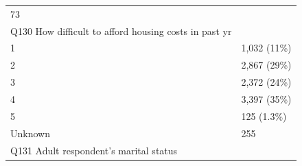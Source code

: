 \documentclass[]{article}
\begin{document}
\begin{longtable}[]{@{}ll@{}}
\begin{minipage}[t]{0.23\columnwidth}
73\strut
\end{minipage}\tabularnewline
\begin{minipage}[t]{0.71\columnwidth}\raggedright
Q130 How difficult to afford housing costs in past yr\strut
\end{minipage} & \begin{minipage}[t]{0.23\columnwidth}\raggedright
\strut
\end{minipage}\tabularnewline
\begin{minipage}[t]{0.71\columnwidth}\raggedright
1\strut
\end{minipage} & \begin{minipage}[t]{0.23\columnwidth}\raggedright
1,032 (11\%)\strut
\end{minipage}\tabularnewline
\begin{minipage}[t]{0.71\columnwidth}\raggedright
2\strut
\end{minipage} & \begin{minipage}[t]{0.23\columnwidth}\raggedright
2,867 (29\%)\strut
\end{minipage}\tabularnewline
\begin{minipage}[t]{0.71\columnwidth}\raggedright
3\strut
\end{minipage} & \begin{minipage}[t]{0.23\columnwidth}\raggedright
2,372 (24\%)\strut
\end{minipage}\tabularnewline
\begin{minipage}[t]{0.71\columnwidth}\raggedright
4\strut
\end{minipage} & \begin{minipage}[t]{0.23\columnwidth}\raggedright
3,397 (35\%)\strut
\end{minipage}\tabularnewline
\begin{minipage}[t]{0.71\columnwidth}\raggedright
5\strut
\end{minipage} & \begin{minipage}[t]{0.23\columnwidth}\raggedright
125 (1.3\%)\strut
\end{minipage}\tabularnewline
\begin{minipage}[t]{0.71\columnwidth}\raggedright
Unknown\strut
\end{minipage} & \begin{minipage}[t]{0.23\columnwidth}\raggedright
255\strut
\end{minipage}\tabularnewline
\begin{minipage}[t]{0.71\columnwidth}\raggedright
Q131 Adult respondent's marital status\strut
\end{minipage} & \begin{minipage}[t]{0.23\columnwidth}\raggedright

\end{minipage}
\end{longtable}
\end{document}
